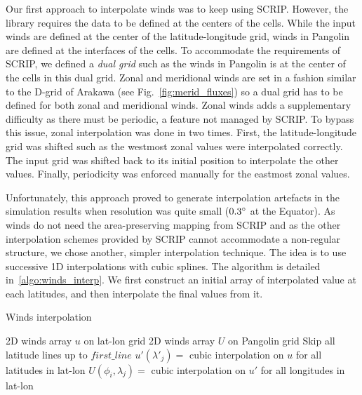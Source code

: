 Our first approach to interpolate winds was to keep using SCRIP\@. However, the
library requires the data to be defined at the centers of the cells. While the
input winds are defined at the center of the latitude-longitude grid, winds in
Pangolin are defined at the interfaces of the cells. To accommodate the
requirements of SCRIP, we defined a \textit{dual grid}
such as the winds in Pangolin is at the center of the cells in this dual
grid. Zonal and meridional winds are set in a fashion similar to the D-grid of
Arakawa (see Fig.~\ref{fig:merid_fluxes}) so a dual grid has to be defined for both
zonal and meridional winds. Zonal winds adds a supplementary difficulty as there
must be periodic, a feature not managed by SCRIP\@. To bypass this issue, zonal
interpolation was done in two times. First, the latitude-longitude grid was
shifted such as the westmost zonal values were interpolated correctly. The
input grid was shifted back to its initial position to interpolate the other
values. Finally, periodicity was enforced manually for the eastmost zonal
values. 

Unfortunately, this approach proved to generate interpolation artefacts in the
simulation results when resolution was quite small ($0.3^{\circ}$ at the Equator).
As winds do not need the area-preserving mapping from SCRIP and as the other
interpolation schemes provided by SCRIP cannot accommodate a non-regular
structure, we chose another, simpler interpolation technique. The idea is to use
successive 1D interpolations with cubic splines. The algorithm is detailed
in~\ref{algo:winds_interp}. We first construct an initial array of interpolated
value at each latitudes, and then interpolate the final values from it.

\begin{algorithm}
  \caption{Winds interpolation}
\label{algo:io_seq}
  \begin{algorithmic}
    \Require 2D winds array $u$ on lat-lon grid
    \Ensure 2D winds array $U$ on Pangolin grid
    \State Skip all latitude lines up to $first\_line$
      \State $u'(\lambda'_j) = $ cubic interpolation on $u$ for all latitudes in
      lat-lon
      \EndFor
        \State $U(\phi_i, \lambda_j) = $ cubic interpolation on $u'$ for all
        longitudes in lat-lon
      \EndFor
    \EndFor
  \end{algorithmic}
\label{algo:winds_interp}
\end{algorithm}

